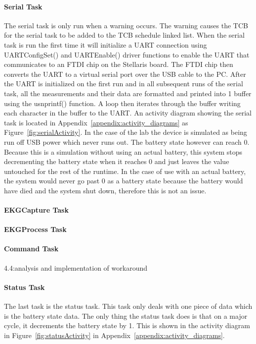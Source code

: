 \documentclass[12pt]{article} %
\begin{document}
    \paragraph{Serial Task} The serial task is only run when a warning occurs.
    The warning causes the TCB for the serial task to be added to the TCB
    schedule linked list. When the serial task is run the first time it will
    initialize a UART connection using UARTConfigSet() and UARTEnable() driver
    functions to enable the UART that communicates to an FTDI chip on the
    Stellaris board. The FTDI chip then converts the UART to a virtual serial
    port over the USB cable to the PC. After the UART is initialized on the
    first run and in all subsequent runs of the serial task, all the
    measurements and their data are formatted and printed into 1 buffer using
    the usnprintf() function. A loop then iterates through the buffer writing
    each character in the buffer to the UART. An activity diagram showing the
serial task is located in Appendix~\ref{appendix:activity_diagrams} as Figure~\ref{fig:serialActivity}.
In the case of the lab the device is simulated as being run off USB power which never runs out. The battery state however can reach 0.
Because this is a simulation without using an actual battery, this system stops decrementing the battery state when it reaches 0 and just leaves the value untouched for the rest of the runtime.
In the case of use with an actual battery, the system would never go past 0 as a battery state because the battery would have died and the system shut down, therefore this is not an issue.

\paragraph{EKGCapture Task}
\paragraph{EKGProcess Task}
\paragraph{Command Task}
4.4:analysis and implementation of workaround
    \paragraph{Status Task}
    The last task is the status task. This task only deals with one piece of data
    which is the battery state data. The only thing the status task does is that on
    a major cycle, it decrements the battery state by 1. This is shown in the
		activity diagram in Figure~\ref{fig:statusActivity} in Appendix~\ref{appendix:activity_diagrams}.
\end{document}

